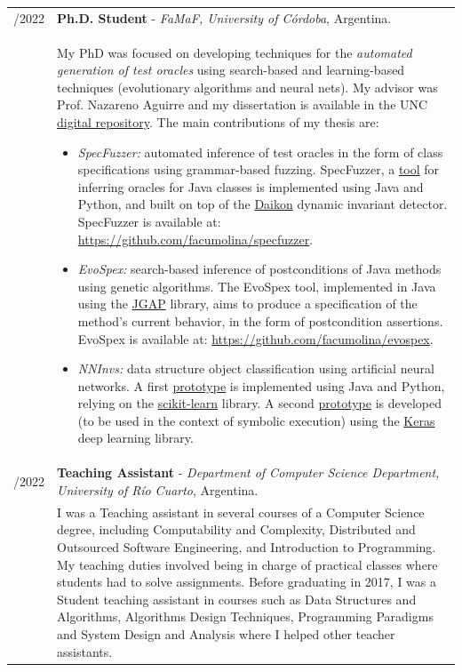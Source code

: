 \documentclass[a4paper,10pt]{article} %
\begin{document}
\begin{longtable}{>{\raggedleft\arraybackslash}p{} p{}}
2017/2022 & \textbf{Ph.D. Student} - \textit{FaMaF, University of Córdoba}, Argentina. \\ 
& My PhD was focused on developing techniques for the \textit{automated generation of test oracles} using search-based and learning-based techniques (evolutionary algorithms and neural nets). My advisor was Prof. Nazareno Aguirre and my dissertation is available in the UNC \href{https://rdu.unc.edu.ar/handle/11086/26692}{digital repository}. The main contributions of my thesis are: 
\begin{itemize}
\setlength\itemsep{0.1em}
\item \textit{SpecFuzzer:} automated inference of test oracles in the form of class specifications using grammar-based fuzzing. SpecFuzzer, a \href{https://github.com/facumolina/specfuzzer}{tool} for inferring oracles for Java classes is implemented using Java and Python, and built on top of the \href{https://plse.cs.washington.edu/daikon/}{Daikon} dynamic invariant detector. SpecFuzzer is available at: \href{https://github.com/facumolina/specfuzzer}{https://github.com/facumolina/specfuzzer}.
\item \textit{EvoSpex:} search-based inference of postconditions of Java methods using genetic algorithms. The EvoSpex tool, implemented in Java using the \href{https://homepages.ecs.vuw.ac.nz/~lensenandr/jgap/documentation/}{JGAP} library, aims to produce a specification of the method's current behavior, in the form of postcondition assertions. EvoSpex is available at: \href{https://github.com/facumolina/evospex}{https://github.com/facumolina/evospex}.
\item \textit{NNInvs:} data structure object classification using artificial neural networks. A first \href{https://sites.google.com/site/learninginvariants}{prototype} is implemented using Java and Python, relying on the \href{https://scikit-learn.org/stable/index.html}{scikit-learn} library. A second \href{https://sites.google.com/site/learninginvariants}{prototype} is developed (to be used in the context of symbolic execution) using the \href{https://keras.io/}{Keras} deep learning library.
\end{itemize} \\ 

2014/2022 & \textbf{Teaching Assistant} - \textit{Department of Computer Science Department, University of Río Cuarto}, Argentina. \\ 
& I was a Teaching assistant in several courses of a Computer Science degree, including Computability and Complexity, Distributed and Outsourced Software Engineering, and Introduction to Programming. My teaching duties involved being in charge of practical classes where students had to solve assignments. Before graduating in 2017, I was a Student teaching assistant in courses such as Data Structures and Algorithms, Algorithms Design Techniques, Programming Paradigms and System Design and Analysis where I helped other teacher assistants. \\ 


\end{longtable}
\end{document}
